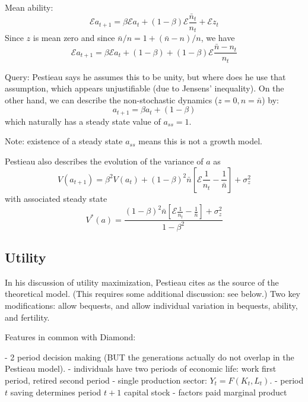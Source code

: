 \documentclass{article}
\newcommand{\E}{\mathcal{E}}
\begin{document}
Mean ability:
\begin{equation}
\E a_{t+1} = \beta \E a_{t} + (1-\beta) \E\frac{\bar{n}_{t}}{n_{t}} + \E z_{t}
\end{equation}
Since $z$ is mean zero and since $\bar{n}/n = 1 + (\bar{n}-n)/n$, we have
\begin{equation}
\E a_{t+1} = \beta \E a_{t} + (1-\beta) + (1-\beta) \E\frac{\bar{n}-n_{t}}{n_{t}}
\end{equation}


Query: Pestieau says he assumes this to be unity, but where does he use that assumption,
which appears unjustifiable (due to Jensens' inequality).
On the other hand,
we can describe the non-stochastic dynamics ($z=0, n=\bar{n}$) by:
\begin{equation}
a_{t+1} = \beta a_{t} + (1-\beta)
\end{equation}
which naturally has a steady state value of $a_{ss}=1$.

Note: existence of a steady state $a_{ss}$ means this is not a growth model.

Pestieau also describes the evolution of the variance of $a$ as
\begin{equation}
V(a_{t+1}) = \beta^{2} V(a_{t}) + (1-\beta)^{2}\bar{n}[\E \frac{1}{n_{t}} - \frac{1}{\bar{n}}] + \sigma_{z}^{2}
\tag{Pestieau 5}
\end{equation}
with associated steady state
\begin{equation}
V^{*}(a) = \frac{(1-\beta)^{2}\bar{n}[\E \frac{1}{n_{t}} - \frac{1}{\bar{n}}] + \sigma_{z}^{2}}{1-\beta^{2}}
\tag{Pestieau 6}
\end{equation}

\subsection{Utility}

In his discussion of utility maximization,
Pestieau cites \citet{diamond-1965-aer} as the source of the theoretical model.
(This requires some additional discussion: see below.)
Two key modifications:
allow bequests,
and allow individual variation in bequests, ability, and fertility.

Features in common with Diamond:

- 2 period decision making (BUT the generations actually do not overlap in the Pestieau model).
- individuals have two periods of economic life: work first period, retired second period
- single production sector: $Y_{t} = F(K_{t}, L_{t})$.
- period $t$ saving determines period $t+1$ capital stock
- factors paid marginal product
\end{document}
